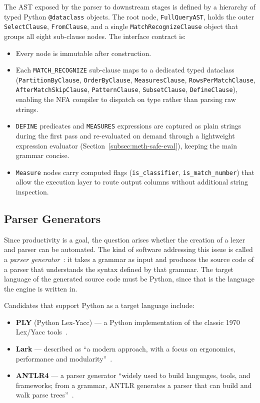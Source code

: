 The AST exposed by the parser to downstream stages is defined by a
hierarchy of typed Python \texttt{@dataclass} objects.  The root
node, \texttt{FullQueryAST}, holds the outer \texttt{SelectClause},
\texttt{FromClause}, and a single \texttt{MatchRecognizeClause}
object that groups all eight sub-clause nodes.  The interface
contract is:

\begin{itemize}
  \item Every node is immutable after construction.
  \item Each \texttt{MATCH\_RECOGNIZE} sub-clause maps to a
    dedicated typed dataclass
    (\texttt{PartitionByClause}, \texttt{OrderByClause},
     \texttt{MeasuresClause}, \texttt{RowsPerMatchClause},
     \texttt{AfterMatchSkipClause}, \texttt{PatternClause},
     \texttt{SubsetClause}, \texttt{DefineClause}),
    enabling the NFA compiler to dispatch on type rather than
    parsing raw strings.
  \item \texttt{DEFINE} predicates and \texttt{MEASURES}
    expressions are captured as plain strings during the first
    pass and re-evaluated on demand through a lightweight
    expression evaluator (Section~\ref{subsec:meth-safe-eval}),
    keeping the main grammar concise.
  \item \texttt{Measure} nodes carry computed flags
    (\texttt{is\_classifier}, \texttt{is\_match\_number}) that
    allow the execution layer to route output columns without
    additional string inspection.
\end{itemize}

\subsection{Parser Generators}
\label{subsec:meth-parser-generators}

Since productivity is a goal, the question arises whether the
creation of a lexer and parser can be automated.  The kind of
software addressing this issue is called a
\emph{parser generator}~\cite{mogensen2024compiler}: it takes a
grammar as input and produces the source code of a parser that
understands the syntax defined by that grammar.  The target
language of the generated source code must be Python, since that
is the language the engine is written in.

Candidates that support Python as a target language include:

\begin{itemize}
  \item \textbf{PLY} (Python Lex-Yacc) --- a Python implementation
    of the classic 1970 Lex/Yacc tools~\cite{ply_tool}.
  \item \textbf{Lark} --- described as ``a modern approach, with a
    focus on ergonomics, performance and
    modularity''~\cite{lark_tool}.
  \item \textbf{ANTLR4} --- a parser generator ``widely used to
    build languages, tools, and frameworks; from a grammar, ANTLR
    generates a parser that can build and walk parse
    trees''~\cite{Parr2013}.
\end{itemize}

